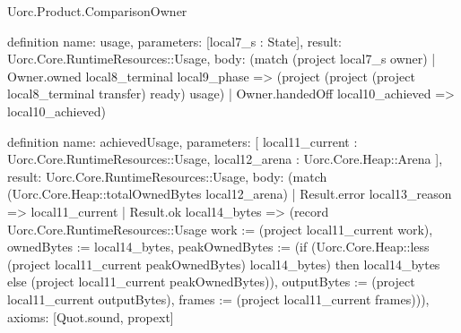 \begin{lexlean}{Uorc.Product.ComparisonOwner}
\begin{semanticmodule}
definition{
  name: usage,
  parameters: [local7_s : State],
  result: Uorc.Core.RuntimeResources::Usage,
  body: (match (project local7_s owner)
    | Owner.owned local8_terminal local9_phase => (project (project (project local8_terminal transfer) ready) usage)
    | Owner.handedOff local10_achieved => local10_achieved)
}

definition{
  name: achievedUsage,
  parameters: [
    local11_current : Uorc.Core.RuntimeResources::Usage,
    local12_arena : Uorc.Core.Heap::Arena
  ],
  result: Uorc.Core.RuntimeResources::Usage,
  body: (match (Uorc.Core.Heap::totalOwnedBytes local12_arena)
    | Result.error local13_reason => local11_current
    | Result.ok local14_bytes => (record Uorc.Core.RuntimeResources::Usage {work := (project local11_current work), ownedBytes := local14_bytes, peakOwnedBytes := (if (Uorc.Core.Heap::less (project local11_current peakOwnedBytes) local14_bytes) then local14_bytes else (project local11_current peakOwnedBytes)), outputBytes := (project local11_current outputBytes), frames := (project local11_current frames)})),
  axioms: [Quot.sound, propext]
}


\end{semanticmodule}
\end{lexlean}
